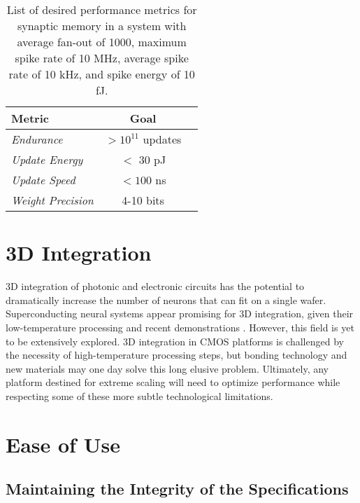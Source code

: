 \documentclass[conference]{IEEEtran}
\begin{document}
\begin{table}
  \begin{center}
    \label{tab:memory_metrics}
    \begin{tabular}{l|c|r} %
      \textbf{Metric} & \textbf{Goal} \\
      \hline
      \textit{Endurance} & $>10^{11}$ updates \\
      \textit{Update Energy} & $<$ 30 pJ\\
      \textit{Update Speed} & $<100$ ns \\
      \textit{Weight Precision} & 4-10 bits
      
    \end{tabular}
    \caption{List of desired performance metrics for synaptic memory in a system with average fan-out of 1000, maximum spike rate of 10 MHz, average spike rate of 10 kHz, and spike energy of 10 fJ.}
  \end{center}
\end{table}

\section{3D Integration}
3D integration of photonic and electronic circuits has the potential to dramatically increase the number of neurons that can fit on a single wafer. Superconducting neural systems appear promising for 3D integration, given their low-temperature processing and recent demonstrations \cite{tolpygo2019planarized}. However, this field is yet to be extensively explored. 3D integration in CMOS platforms is challenged by the necessity of high-temperature processing steps, but bonding technology and new materials may one day solve this long elusive problem. Ultimately, any platform destined for extreme scaling will need to optimize performance while respecting some of these more subtle technological limitations.



\section{Ease of Use}

\subsection{Maintaining the Integrity of the Specifications}
\end{document}
